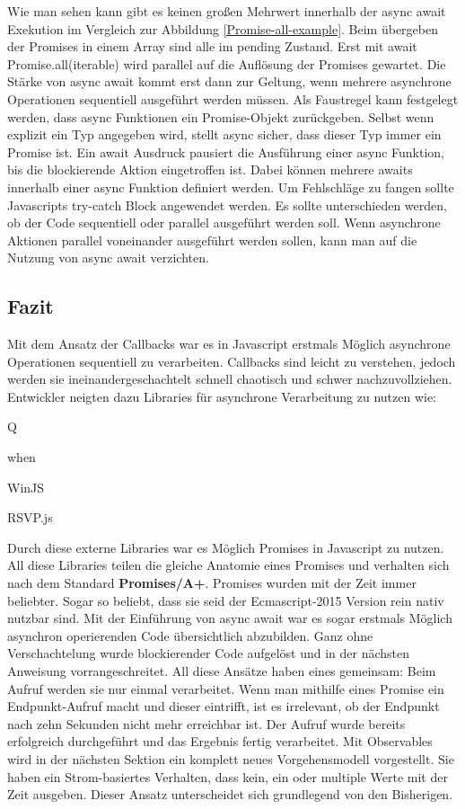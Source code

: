 \noindent
Wie man sehen kann gibt es keinen großen Mehrwert innerhalb der async await Exekution im Vergleich zur Abbildung \ref{Promise-all-example}. Beim übergeben der Promises in einem Array sind alle im pending Zustand. Erst mit await Promise.all(iterable) wird parallel auf die Auflösung der Promises gewartet. Die Stärke von async await kommt erst dann zur Geltung, wenn mehrere asynchrone Operationen sequentiell ausgeführt werden müssen. Als Faustregel kann festgelegt werden, dass async Funktionen ein Promise-Objekt zurückgeben. Selbst wenn explizit ein Typ angegeben wird, stellt async sicher, dass dieser Typ immer ein Promise ist. Ein await Ausdruck pausiert die Ausführung einer async Funktion, bis die blockierende Aktion eingetroffen ist. Dabei können mehrere awaits innerhalb einer async Funktion definiert werden. Um Fehlschläge zu fangen sollte Javascripts try-catch Block angewendet werden. Es sollte unterschieden werden, ob der Code sequentiell oder parallel ausgeführt werden soll. Wenn asynchrone Aktionen parallel voneinander ausgeführt werden sollen, kann man auf die Nutzung von async await verzichten.

\subsection{Fazit}

Mit dem Ansatz der Callbacks war es in Javascript erstmals Möglich asynchrone Operationen sequentiell zu verarbeiten. Callbacks sind leicht zu verstehen, jedoch werden sie ineinandergeschachtelt schnell chaotisch und schwer nachzuvollziehen. Entwickler neigten dazu Libraries für asynchrone Verarbeitung zu nutzen wie:

\begin{description}
\item Q
\item when
\item WinJS
\item RSVP.js
\end{description}

\noindent
Durch diese externe Libraries war es Möglich Promises in Javascript zu nutzen. All diese Libraries teilen die gleiche Anatomie eines Promises und verhalten sich nach dem Standard \textbf{Promises/A+}\cite{promises-a+}. Promises wurden mit der Zeit immer beliebter. Sogar so beliebt, dass sie seid der Ecmascript-2015 Version rein nativ nutzbar sind. Mit der Einführung von async await war es sogar erstmals Möglich asynchron operierenden Code übersichtlich abzubilden. Ganz ohne Verschachtelung wurde blockierender Code aufgelöst und in der nächsten Anweisung vorrangeschreitet. All diese Ansätze haben eines gemeinsam: Beim Aufruf werden sie nur einmal verarbeitet. Wenn man mithilfe eines Promise ein Endpunkt-Aufruf macht und dieser eintrifft, ist es irrelevant, ob der Endpunkt nach zehn Sekunden nicht mehr erreichbar ist. Der Aufruf wurde bereits erfolgreich durchgeführt und das Ergebnis fertig verarbeitet. Mit Observables wird in der nächsten Sektion ein komplett neues Vorgehensmodell vorgestellt. Sie haben ein Strom-basiertes Verhalten, dass kein, ein oder multiple Werte mit der Zeit ausgeben. Dieser Ansatz unterscheidet sich grundlegend von den Bisherigen.
